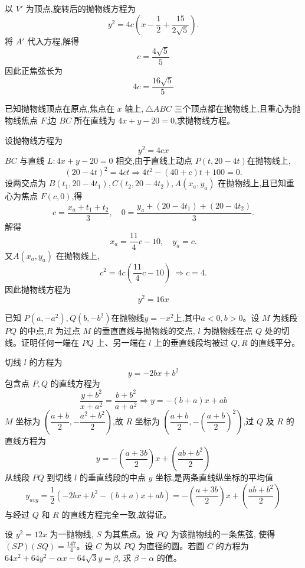 \begin{questions}
\begin{solution}
        以 $V'$ 为顶点,旋转后的抛物线方程为
        \[
        y^2 = 4c\left(x - \frac{1}{2} + \frac{15}{2\sqrt 5}\right).
        \]
        将 $A'$ 代入方程,解得
        \[
        c = \frac{4\sqrt 5}{5}
        \]
        因此正焦弦长为
        \[
        4c = \frac{16\sqrt 5}{5}
        \]
    \end{solution}

    \question 已知抛物线顶点在原点,焦点在 $x$ 轴上,$\ \triangle ABC$ 三个顶点都在抛物线上,且重心为抛物线焦点 $F$,边 $BC$ 所在直线为 $4x+y-20=0$,求抛物线方程。
    \begin{solution}
        设抛物线方程为
        \[
        y^2 = 4c x
        \]
        $BC$ 与直线 $L: 4x+y-20=0$ 相交,由于直线上动点 $P(t,20-4t)$在抛物线上,
        \[
        (20-4t)^2 = 4 c t \Rightarrow 4 t^2 - (40+c) t + 100 =0.
        \]
        设两交点为 $B(t_1,20-4t_1),C(t_2,20-4t_2),A(x_a,y_a)$ 在抛物线上,且已知重心为焦点 $F(c,0)$,得
        \[
        c = \frac{x_a + t_1 + t_2}{3}, \quad 0 = \frac{y_a + (20-4t_1) + (20-4t_2)}{3}.
        \]
        解得
        \[
        x_a = \frac{11}{4}c -10, \quad y_a = c.
        \]
        又$A(x_a,y_a)$ 在抛物线上,
        \[
        c^2 = 4 c \left(\frac{11}{4}c - 10 \right) \ \Rightarrow c=4.
        \]
        因此抛物线方程为
        \[
        y^2 = 16 x
        \]
    \end{solution}

    \question 已知 $P(a, -a^2),Q(b, -b^2)$在抛物线$y = -x^2$上,其中$a < 0,b > 0$。设 $M$ 为线段 $PQ$ 的中点,$R$ 为过点 $M$ 的垂直直线与抛物线的交点, $l$ 为抛物线在点 $Q$ 处的切线。证明任何一端在 $PQ$ 上、另一端在 $l$ 上的垂直线段均被过 $Q,R$ 的直线平分。
    \begin{solution}
        切线 $l$ 的方程为
        \[ 
        y = -2bx + b^2 
        \]
        包含点 $P,Q$ 的直线方程为
        \[ 
        \frac{y+b^2}{x+a^2}=\frac{b+b^2}{a+a^2} \Rightarrow y = -(b+a)x + ab 
        \]
        $M$ 坐标为 $\left(\dfrac{a+b}{2},-\dfrac{a^2+b^2}{2}\right)$,故 $R$ 坐标为 $\left(\dfrac{a+b}{2}, -\left(\dfrac{a+b}{2}\right)^2\right)$,过
        $Q$ 及 $R$ 的直线方程为
        \[ 
        y = -\left(\frac{a+3b}{2}\right)x + \left(\frac{ab+b^2}{2}\right) 
        \]
        从线段 $PQ$ 到切线 $l$ 的垂直线段的中点 $y$ 坐标,是两条直线纵坐标的平均值
        \[ 
        y_{avg} = \frac{1}{2}(-2bx + b^2 - (b+a)x + ab) = -\left(\frac{a+3b}{2}\right)x + \left(\frac{ab+b^2}{2}\right)
        \]
        与经过 $Q$ 和 $R$ 的直线方程完全一致,故得证。
    \end{solution}
\question
设 $y^2 = 12x$ 为一抛物线, $S$ 为其焦点。设 $PQ$ 为该抛物线的一条焦弦, 使得 $(SP)(SQ) = \frac{147}{4}$。设 $C$ 为以 $PQ$ 为直径的圆。若圆 $C$ 的方程为 $64x^2 + 64y^2 - \alpha x - 64\sqrt{3}y = \beta$, 求 $\beta - \alpha$ 的值。


\end{questions}
